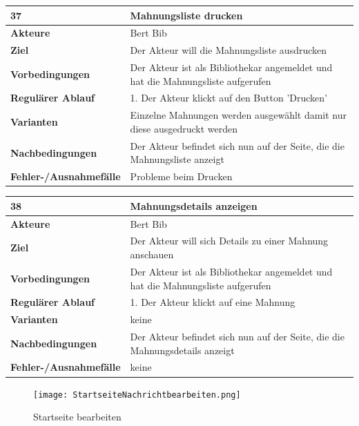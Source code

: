 \documentclass[fontsize=12pt,paper=a4,twoside]{scrartcl}
\begin{document}
\begin{table}
	[H] \label{37} 
	\begin{tabular}
		{|l|p{10cm}|} \hline \textbf{37} & \textbf{Mahnungsliste drucken} \\
		\hline \textbf{Akteure} & Bert Bib\\
		\hline \textbf{Ziel} & Der Akteur will die Mahnungsliste ausdrucken \\
		\hline \textbf{Vorbedingungen} & Der Akteur ist als Bibliothekar angemeldet und hat die Mahnungsliste aufgerufen \\
		\hline \textbf{Regulärer Ablauf} & 1. Der Akteur klickt auf den Button 'Drucken' \\
		\hline \textbf{Varianten} & Einzelne Mahnungen werden ausgewählt damit nur diese ausgedruckt werden \\
		\hline \textbf{Nachbedingungen} & Der Akteur befindet sich nun auf der Seite, die die Mahnungsliste anzeigt\\
		\hline \textbf{Fehler-/Ausnahmefälle} & Probleme beim Drucken\\
		\hline 
	\end{tabular}
\end{table}
\begin{table}
	[H] \label{38} 
	\begin{tabular}
		{|l|p{10cm}|} \hline \textbf{38} & \textbf{Mahnungsdetails anzeigen} \\
		\hline \textbf{Akteure} & Bert Bib\\
		\hline \textbf{Ziel} & Der Akteur will sich Details zu einer Mahnung anschauen \\
		\hline \textbf{Vorbedingungen} & Der Akteur ist als Bibliothekar angemeldet und hat die Mahnungsliste aufgerufen \\
		\hline \textbf{Regulärer Ablauf} & 1. Der Akteur klickt auf eine Mahnung \\
		\hline \textbf{Varianten} & keine \\
		\hline \textbf{Nachbedingungen} & Der Akteur befindet sich nun auf der Seite, die die Mahnungsdetails anzeigt\\
		\hline \textbf{Fehler-/Ausnahmefälle} & keine\\
		\hline 
	\end{tabular}
\end{table}
\begin{figure}
	[H] \caption{Startseite bearbeiten} 
	\texttt{[image: StartseiteNachrichtbearbeiten.png]} \label{pic:StartseiteBearbeiten} 
\end{figure}
\end{document}
